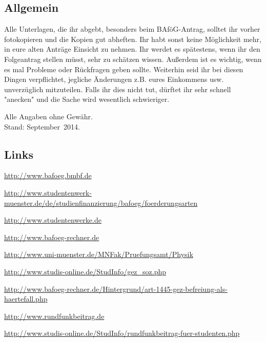 \begin{multicols*}{2}
\subsection*{Allgemein}
Alle Unterlagen, die ihr abgebt, besonders beim BAföG-Antrag, solltet ihr vorher fotokopieren und die Kopien gut abheften. Ihr habt sonst keine Möglichkeit mehr, in eure alten Anträge Einsicht zu nehmen. Ihr werdet es spätestens, wenn ihr den Folgeantrag stellen müsst, sehr zu schätzen wissen. Außerdem ist es wichtig, wenn es mal Probleme oder Rückfragen geben sollte. Weiterhin seid ihr bei diesen Dingen verpflichtet, jegliche Änderungen z.B. eures Einkommens usw. unverzüglich mitzuteilen. Falls ihr dies nicht tut, dürftet ihr sehr schnell "anecken" und die Sache wird wesentlich schwieriger.

\begin{flushright}
Alle Angaben ohne Gewähr.\\
Stand: September~2014.
\end{flushright}

\subsection*{Links}
\begin{flushleft}
\begin{fibelurl}
\url{http://www.bafoeg.bmbf.de}
\label{geld:bmbf}
\end{fibelurl}
\begin{fibelurl}
\url{http://www.studentenwerk-muenster.de/de/studienfinanzierung/bafoeg/foerderungsarten}
\label{geld:studentenwerk-ms}
\end{fibelurl}
\begin{fibelurl}
\url{http://www.studentenwerke.de}
\label{geld:studentenwerke}
\end{fibelurl}
\begin{fibelurl}
\url{http://www.bafoeg-rechner.de}
\label{geld:bafoeg-rechner}
\end{fibelurl}
\begin{fibelurl}
\url{http://www.uni-muenster.de/MNFak/Pruefungsamt/Physik}
\label{geld:pa_physik}
\end{fibelurl}
\begin{fibelurl}
\url{http://www.studis-online.de/StudInfo/gez_soz.php}
\label{geld:gez}
\end{fibelurl}
\begin{fibelurl}
\url{http://www.bafoeg-rechner.de/Hintergrund/art-1445-gez-befreiung-als-haertefall.php}
\label{geld:gez_härtefall}
\end{fibelurl}
\begin{fibelurl}
\url{http://www.rundfunkbeitrag.de}
\label{geld:rundfunkbeitrag}
\end{fibelurl}
\begin{fibelurl}
\url{http://www.studis-online.de/StudInfo/rundfunkbeitrag-fuer-studenten.php}
\label{geld:rundfunkbeitrag_studenten}
\end{fibelurl}
\end{flushleft}

\end{multicols*}

